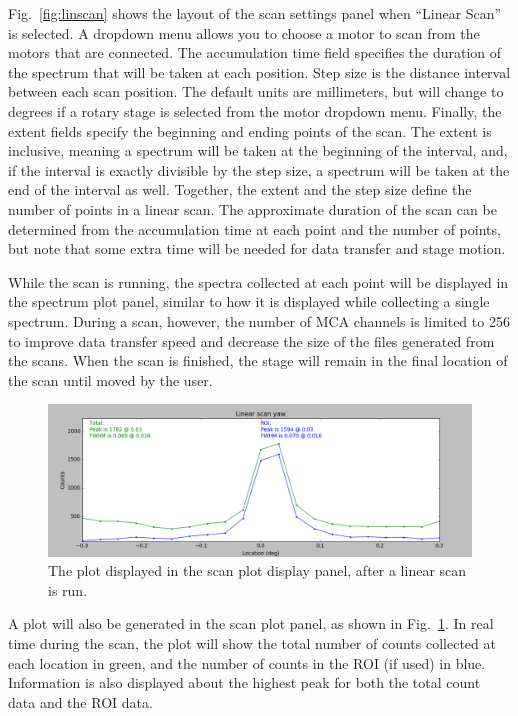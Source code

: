 Fig.~\ref{fig:linscan} shows the layout of the scan settings panel when ``Linear Scan'' is selected. A dropdown menu allows you to choose a motor to scan from the motors that are connected. The accumulation time field specifies the duration of the spectrum that will be taken at each position. Step size is the distance interval between each scan position. The default units are millimeters, but will change to degrees if a rotary stage is selected from the motor dropdown menu. Finally, the extent fields specify the beginning and ending points of the scan. The extent is inclusive, meaning a spectrum will be taken at the beginning of the interval, and, if the interval is exactly divisible by the step size, a spectrum will be taken at the end of the interval as well. Together, the extent and the step size define the number of points in a linear scan. The approximate duration of the scan can be determined from the accumulation time at each point and the number of points, but note that some extra time will be needed for data transfer and stage motion.

While the scan is running, the spectra collected at each point will be displayed in the spectrum plot panel, similar to how it is displayed while collecting a single spectrum. During a scan, however, the number of MCA channels is limited to 256 to improve data transfer speed and decrease the size of the files generated from the scans. When the scan is finished, the stage will remain in the final location of the scan until moved by the user.

\begin{figure}
\centering
\includegraphics[width=\textwidth]{linplot.png}
\caption{\label{fig:linplot} The plot displayed in the scan plot display panel, after a linear scan is run.}
\end{figure}

A plot will also be generated in the scan plot panel, as shown in Fig.~\ref{fig:linplot}. In real time during the scan, the plot will show the total number of counts collected at each location in green, and the number of counts in the ROI (if used) in blue. Information is also displayed about the highest peak for both the total count data and the ROI data.

